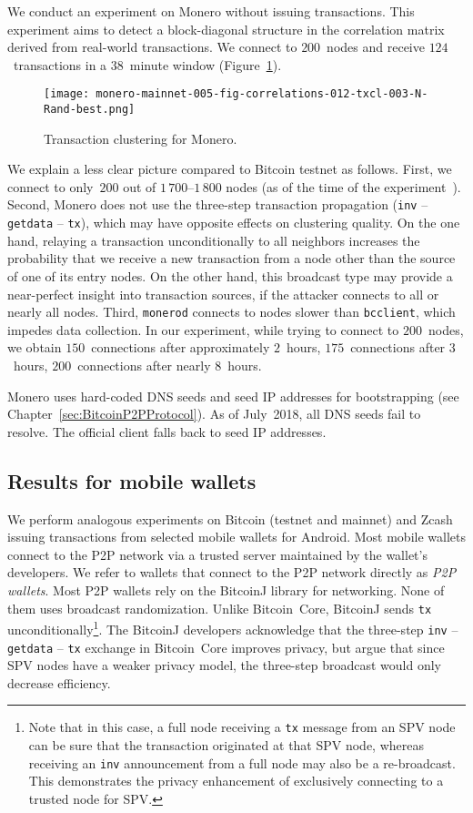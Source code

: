 We conduct an experiment on Monero without issuing transactions.
This experiment aims to detect a block-diagonal structure in the correlation matrix derived from real-world transactions.
We connect to $200$~nodes and receive $124$~transactions in a $38$~minute window (Figure~\ref{fig:monero}).

\begin{figure}[!t]
	\centering
	\texttt{[image: monero-mainnet-005-fig-correlations-012-txcl-003-N-Rand-best.png]}
	\caption{Transaction clustering for Monero.}
	\label{fig:monero}
\end{figure}

We explain a less clear picture compared to Bitcoin testnet as follows.
First, we connect to only~$200$ out of $1\,700$--$1\,800$ nodes (as of the time of the experiment~\cite{MoneroHash}).
Second, Monero does not use the three-step transaction propagation (\texttt{inv} -- \texttt{getdata} -- \texttt{tx}), which may have opposite effects on clustering quality.
On the one hand, relaying a transaction unconditionally to all neighbors increases the probability that we receive a new transaction from a node other than the source of one of its entry nodes.
On the other hand, this broadcast type may provide a near-perfect insight into transaction sources, if the attacker connects to all or nearly all nodes.
Third, \texttt{monerod} connects to nodes slower than \texttt{bcclient}, which impedes data collection.
In our experiment, while trying to connect to $200$~nodes, we obtain $150$~connections after approximately $2$~hours, $175$~connections after $3$~hours, $200$~connections after nearly $8$~hours.

Monero uses hard-coded DNS seeds and seed IP addresses for bootstrapping (see Chapter~\ref{sec:BitcoinP2PProtocol}).
As of July~2018, all DNS seeds fail to resolve.
The official client falls back to seed IP addresses.


\subsection{Results for mobile wallets}

We perform analogous experiments on Bitcoin (testnet and mainnet) and Zcash issuing transactions from selected mobile wallets for Android.
Most mobile wallets connect to the P2P network via a trusted server maintained by the wallet's developers.
We refer to wallets that connect to the P2P network directly as \textit{P2P wallets}.
Most P2P wallets rely on the BitcoinJ library for networking.
None of them uses broadcast randomization.
Unlike Bitcoin~Core, BitcoinJ sends \texttt{tx} unconditionally\footnote{Note that in this case, a full node receiving a \texttt{tx} message from an SPV node can be sure that the transaction originated at that SPV node, whereas receiving an \texttt{inv} announcement from a full node may also be a re-broadcast. This demonstrates the privacy enhancement of exclusively connecting to a trusted node for SPV.}.
The BitcoinJ developers acknowledge that the three-step \texttt{inv} -- \texttt{getdata} -- \texttt{tx} exchange in Bitcoin~Core improves privacy, but argue that since SPV nodes have a weaker privacy model, the three-step broadcast would only decrease efficiency.


